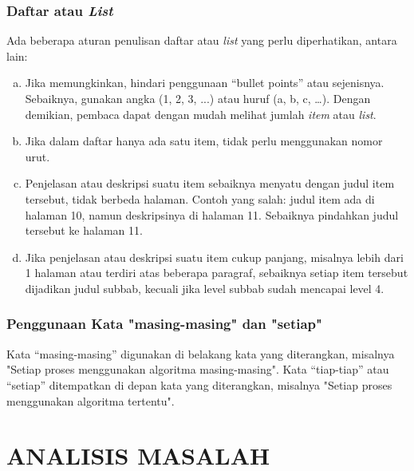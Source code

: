 \documentclass[12pt,a4paper,oneside]{book}
\begin{document}
\subsection{Daftar atau \textit{List}}
Ada beberapa aturan penulisan daftar atau \textit{list} yang perlu diperhatikan, antara lain:
\begin{enumerate}[a)]
\item Jika memungkinkan, hindari penggunaan “bullet points” atau sejenisnya. Sebaiknya, gunakan angka (1, 2, 3, ...) atau huruf (a, b, c, …). Dengan demikian, pembaca dapat dengan mudah melihat jumlah \textit{item} atau \textit{list}. 
\item Jika dalam daftar hanya ada satu item, tidak perlu menggunakan nomor urut.
\item Penjelasan atau deskripsi suatu item sebaiknya menyatu dengan judul item tersebut, tidak berbeda halaman. Contoh yang salah: judul item ada di halaman 10, namun deskripsinya di halaman 11. Sebaiknya pindahkan judul tersebut ke halaman 11.
\item Jika penjelasan atau deskripsi suatu item cukup panjang, misalnya lebih dari 1 halaman atau terdiri atas beberapa paragraf, sebaiknya setiap item tersebut dijadikan judul subbab, kecuali jika level subbab sudah mencapai level 4. 
\end{enumerate}

\subsection{Penggunaan Kata "masing-masing" dan "setiap"}
Kata “masing-masing” digunakan di belakang kata yang diterangkan, misalnya 
"Setiap proses menggunakan algoritma masing-masing". Kata “tiap-tiap” atau “setiap”
ditempatkan di depan kata yang diterangkan, misalnya
"Setiap proses menggunakan algoritma tertentu".



\chapter{ANALISIS MASALAH}
\end{document}
